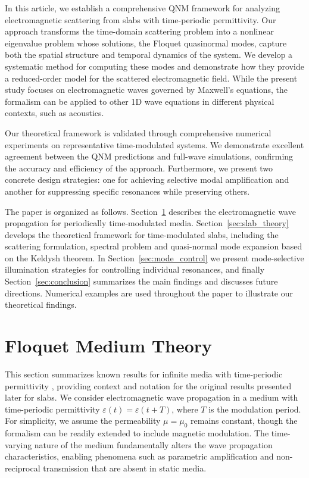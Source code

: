 \documentclass[%
 reprint,
 amsmath,amssymb,
 aps,
 prb,
]{revtex4-2}
\newcommand{\corrections}[1]{#1}
\begin{document}
In this article, we establish a comprehensive QNM framework for analyzing electromagnetic scattering from slabs with time-periodic permittivity. Our approach transforms the time-domain scattering problem into a nonlinear eigenvalue problem whose solutions, the Floquet quasinormal modes, capture both the spatial structure and temporal dynamics of the system. We develop a systematic method for computing these modes and demonstrate how they provide a reduced-order model for the scattered electromagnetic field. \corrections{While the present study focuses on electromagnetic waves governed by Maxwell’s equations, the formalism can be applied to other 1D wave equations in different physical contexts, such as acoustics.}

Our theoretical framework is validated through comprehensive numerical experiments on representative time-modulated systems. We demonstrate excellent agreement between the QNM predictions and full-wave simulations, confirming the accuracy and efficiency of the approach. Furthermore, we present two concrete design strategies: one for achieving selective modal amplification and another for suppressing specific resonances while preserving others.


The paper is organized as follows. Section~\ref{sec:theory} describes the electromagnetic wave propagation for periodically time-modulated media. Section~\ref{sec:slab_theory} develops the theoretical framework for time-modulated slabs, including the scattering formulation, spectral problem and quasi-normal mode expansion based on the Keldysh theorem. In Section~\ref{sec:mode_control} we present mode-selective illumination strategies for controlling individual resonances, and finally Section~\ref{sec:conclusion} summarizes the main findings and discusses future directions. Numerical examples are used throughout the paper to illustrate our theoretical findings.

\section{Floquet Medium Theory}
\label{sec:theory}

\corrections{This section summarizes known results for infinite media with time-periodic permittivity \cite{zurita-sanchez2009}, providing context and notation for the original results presented later for slabs.}
We consider electromagnetic wave propagation in a medium with time-periodic permittivity $\varepsilon(t) = \varepsilon(t + T)$, where $T$ is the modulation period. For simplicity, we assume the permeability $\mu = \mu_0$ remains constant, though the formalism can be readily extended to include magnetic modulation. The time-varying nature of the medium fundamentally alters the wave propagation characteristics, enabling phenomena such as parametric amplification and non-reciprocal transmission that are absent in static media.
\end{document}
